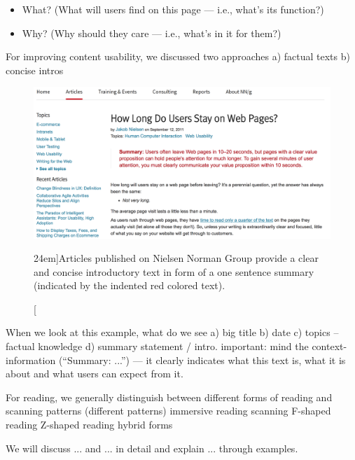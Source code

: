 \begin{itemize}
	\item What? (What will users find on this page --- i.e., what's its function?)
	\item Why? (Why should they care --- i.e., what's in it for them?)
\end{itemize}

For improving content usability, we discussed two approaches
a) factual texts
b) concise intros

\begin{figure}%
	\centering
  \includegraphics[width=1.50\textwidth]{../figures/good_intro_nngroup.png}
  \caption[][24em]{Articles published on Nielsen Norman Group provide a clear and concise introductory text in form of a one sentence summary (indicated by the indented red colored text). }
  \label{fig:content usability}
\end{figure}

When we look at this example, what do we see
a) big title
b) date
c) topics -- factual knowledge
d) summary statement / intro. important: mind the context-information (``Summary: ...'') --- it clearly indicates what this text is, what it is about and what users can expect from it.






For reading, we generally distinguish between different forms of reading and scanning patterns (different patterns)
immersive reading
scanning
F-shaped reading
Z-shaped reading
hybrid forms

We will discuss ... and ... in detail and explain ... through examples.

